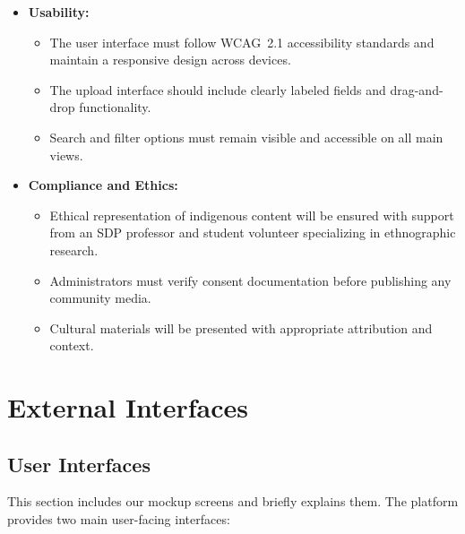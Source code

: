 \begin{itemize}
\item \textbf{Usability:}
\begin{itemize}
\item The user interface must follow WCAG~2.1 accessibility standards and maintain a responsive design across devices.
\item The upload interface should include clearly labeled fields and drag-and-drop functionality.
\item Search and filter options must remain visible and accessible on all main views.
\end{itemize}

\item \textbf{Compliance and Ethics:}
\begin{itemize}
\item Ethical representation of indigenous content will be ensured with support from an SDP professor and student volunteer specializing in ethnographic research.
\item Administrators must verify consent documentation before publishing any community media.
\item Cultural materials will be presented with appropriate attribution and context.
\end{itemize}


\end{itemize}







\section{External Interfaces}

\subsection{User Interfaces}

This section includes our mockup screens and briefly explains them. The platform provides two main user-facing interfaces:

